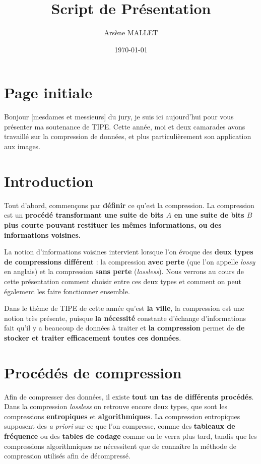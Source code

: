 \documentclass{article}
\title{Script de Pr\'esentation}
\date{\today}
\author{Arsène MALLET}
\begin{document}
\thispagestyle{firstpage}

\begin{center}
    \huge\bfseries{\@title}
\end{center}

\section{Page initiale}

Bonjour [mesdames et messieurs] du jury, je suis ici aujourd'hui pour vous
présenter ma soutenance de TIPE. Cette année, moi et deux camarades avons travaillé
sur la compression de données, et plus particulièrement son application aux images. 

\section{Introduction}

Tout d'abord, commençons par \textbf{définir} ce qu'est la compression. La compression
est un \textbf{procédé transformant une suite de bits $A$ en une suite de bits $B$ plus 
courte pouvant restituer les mêmes informations, ou des informations voisines.}

La notion d'informations voisines intervient lorsque l'on évoque des \textbf{deux types de compressions différent} :
la compression \textbf{avec perte} (que l'on appelle \textit{lossy} en anglais) et la compression \textbf{sans perte}
(\textit{lossless}). Nous verrons au cours de cette présentation comment choisir entre ces deux types et comment on peut
également les faire fonctionner ensemble.

Dans le thème de TIPE de cette année qu'est \textbf{la ville}, la compression est une notion très présente, puisque
\textbf{la nécessité} constante d'échange d'informations fait qu'il y a beaucoup de données à traiter et
\textbf{la compression} permet de \textbf{de stocker et traiter efficacement toutes ces données}.

\section{Procédés de compression}

Afin de compresser des données, il existe \textbf{tout un tas de différents procédés}. Dans la compression
\textit{lossless} on retrouve encore deux types, que sont les compressions \textbf{entropiques} et \textbf{algorithmiques}.
La compression entropiques supposent des \textit{a priori} sur ce que l'on compresse, comme des \textbf{tableaux de fréquence}
ou des \textbf{tables de codage} comme on le verra plus tard, tandis que les compressions algorithmiques ne nécessitent que de connaître
la méthode de compression utilisés afin de décompressé.
\end{document}
